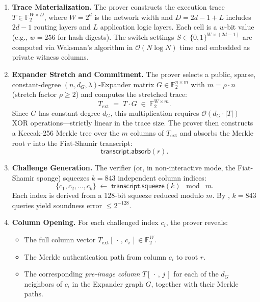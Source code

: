 \documentclass[11pt,a4paper]{article}
\begin{document}
\begin{enumerate}[label=\textbf{Phase \arabic*.},leftmargin=*]

\item \textbf{Trace Materialization.}
The prover constructs the execution trace
$T \in \mathbb{F}_2^{W \times D}$, where $W = 2^d$ is the
network width and $D = 2d - 1 + L$ includes $2d-1$ routing
layers and $L$ application logic layers.  Each cell is a
$w$-bit value (e.g., $w = 256$ for hash digests).  The switch
settings $S \in \{0,1\}^{W \times (2d-1)}$ are computed via
Waksman's algorithm in $\mathcal{O}(N \log N)$ time and
embedded as private witness columns.

\item \textbf{Expander Stretch and Commitment.}
The prover selects a public, sparse, constant-degree
$(n, d_G, \lambda)$-Expander matrix
$G \in \mathbb{F}_2^{n \times m}$ with $m = \rho \cdot n$
(stretch factor $\rho \ge 2$) and computes the stretched
trace:
\[
  T_{\mathrm{ext}} \;=\; T \cdot G
  \;\in\; \mathbb{F}_2^{W \times m}.
\]
Since $G$ has constant degree $d_G$, this multiplication
requires $\mathcal{O}(d_G \cdot |T|)$ XOR operations---strictly
linear in the trace size.  The prover then constructs a
Keccak-256 Merkle tree over the $m$ columns of
$T_{\mathrm{ext}}$ and absorbs the Merkle root $r$ into the
Fiat-Shamir transcript:
\[
  \mathsf{transcript}.\mathsf{absorb}(r).
\]

\item \textbf{Challenge Generation.}
The verifier (or, in non-interactive mode, the Fiat-Shamir
sponge) squeezes $k = 843$ independent column indices:
\[
  \{c_1, c_2, \ldots, c_k\}
  \;\leftarrow\;
  \mathsf{transcript}.\mathsf{squeeze}(k)
  \;\bmod\; m.
\]
Each index is derived from a 128-bit squeeze reduced modulo $m$.
By , $k = 843$ queries yield soundness
error $\le 2^{-128}$.

\item \textbf{Column Opening.}
For each challenged index $c_i$, the prover reveals:
\begin{itemize}
  \item The full column vector
        $T_{\mathrm{ext}}[\,\cdot\,,\, c_i\,]
         \in \mathbb{F}_2^{W}$.
  \item The Merkle authentication path from column $c_i$ to
        root $r$.
  \item The corresponding \emph{pre-image column}
        $T[\,\cdot\,,\, j\,]$ for each of the $d_G$ neighbors
        of $c_i$ in the Expander graph $G$, together with
        their Merkle paths.
\end{itemize}


\end{enumerate}
\end{document}
